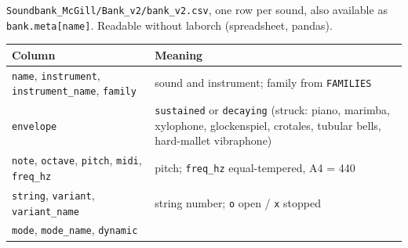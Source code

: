 \documentclass[
  10pt,
]{article}
\begin{document}
\texttt{Soundbank\_McGill/Bank\_v2/bank\_v2.csv}, one row
per sound, also available as \texttt{bank.meta{[}name{]}}.
Readable without laborch (spreadsheet, pandas).

\begin{longtable}[]{@{}ll@{}}
\toprule
\begin{minipage}[b]{0.47\columnwidth}\raggedright
Column\strut
\end{minipage} &
\begin{minipage}[b]{0.47\columnwidth}\raggedright
Meaning\strut
\end{minipage}\tabularnewline
\midrule
\endhead
\begin{minipage}[t]{0.47\columnwidth}\raggedright
\texttt{name}, \texttt{instrument},
\texttt{instrument\_name}, \texttt{family}\strut
\end{minipage} &
\begin{minipage}[t]{0.47\columnwidth}\raggedright
sound and instrument; family from \texttt{FAMILIES}\strut
\end{minipage}\tabularnewline
\begin{minipage}[t]{0.47\columnwidth}\raggedright
\texttt{envelope}\strut
\end{minipage} &
\begin{minipage}[t]{0.47\columnwidth}\raggedright
\texttt{sustained} or \texttt{decaying} (struck: piano,
marimba, xylophone, glockenspiel, crotales, tubular bells,
hard-mallet vibraphone)\strut
\end{minipage}\tabularnewline
\begin{minipage}[t]{0.47\columnwidth}\raggedright
\texttt{note}, \texttt{octave}, \texttt{pitch},
\texttt{midi}, \texttt{freq\_hz}\strut
\end{minipage} &
\begin{minipage}[t]{0.47\columnwidth}\raggedright
pitch; \texttt{freq\_hz} equal-tempered, A4 = 440\strut
\end{minipage}\tabularnewline
\begin{minipage}[t]{0.47\columnwidth}\raggedright
\texttt{string}, \texttt{variant},
\texttt{variant\_name}\strut
\end{minipage} &
\begin{minipage}[t]{0.47\columnwidth}\raggedright
string number; \texttt{o} open / \texttt{x} stopped\strut
\end{minipage}\tabularnewline
\begin{minipage}[t]{0.47\columnwidth}\raggedright
\texttt{mode}, \texttt{mode\_name}, \texttt{dynamic}\strut
\end{minipage} &

\end{longtable}
\end{document}
